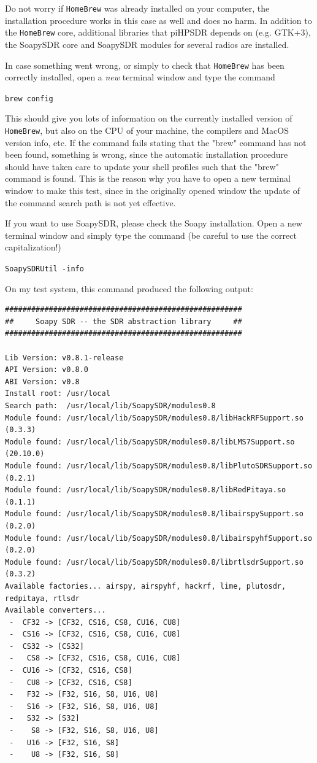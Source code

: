 \documentclass[12pt]{book}
\def\grtt#1{\texttt{\color{magenta}#1}}
\begin{document}
Do not worry if \texttt{HomeBrew} was already installed on your computer, the installation
procedure works in this case as well and does no harm. In addition to
 the \texttt{HomeBrew} core, additional libraries that piHPSDR depends on (e.g. GTK+3), the SoapySDR
 core and SoapySDR modules for several radios are installed. 
 
 In case something went wrong, or simply to check that \texttt{HomeBrew} has been correctly installed,
 open a \textit{new} terminal window and type the command


\grtt{brew config}

 This should give you lots of information on the currently installed version of \texttt{HomeBrew},
 but also on the CPU of your machine, the compilers and MacOS version info, etc. If the command
 fails stating that the "brew" command has not been found, something is wrong, since the automatic
 installation procedure should have taken care to update your shell profiles such that the "brew"
 command is found. This is the reason why you have to open a new terminal window to make this test,
 since in the originally opened window the update of the command search path is not yet effective.

If you want to use SoapySDR, please check the Soapy installation.
Open a new terminal window and simply
type the command (be careful to use the correct capitalization!)

\grtt{SoapySDRUtil -info}

On my test system, this command produced the following output:

\begin{tiny}
\begin{verbatim}
######################################################
##     Soapy SDR -- the SDR abstraction library     ##
######################################################

Lib Version: v0.8.1-release
API Version: v0.8.0
ABI Version: v0.8
Install root: /usr/local
Search path:  /usr/local/lib/SoapySDR/modules0.8
Module found: /usr/local/lib/SoapySDR/modules0.8/libHackRFSupport.so   (0.3.3)
Module found: /usr/local/lib/SoapySDR/modules0.8/libLMS7Support.so     (20.10.0)
Module found: /usr/local/lib/SoapySDR/modules0.8/libPlutoSDRSupport.so (0.2.1)
Module found: /usr/local/lib/SoapySDR/modules0.8/libRedPitaya.so       (0.1.1)
Module found: /usr/local/lib/SoapySDR/modules0.8/libairspySupport.so   (0.2.0)
Module found: /usr/local/lib/SoapySDR/modules0.8/libairspyhfSupport.so (0.2.0)
Module found: /usr/local/lib/SoapySDR/modules0.8/librtlsdrSupport.so   (0.3.2)
Available factories... airspy, airspyhf, hackrf, lime, plutosdr, redpitaya, rtlsdr
Available converters...
 -  CF32 -> [CF32, CS16, CS8, CU16, CU8]
 -  CS16 -> [CF32, CS16, CS8, CU16, CU8]
 -  CS32 -> [CS32]
 -   CS8 -> [CF32, CS16, CS8, CU16, CU8]
 -  CU16 -> [CF32, CS16, CS8]
 -   CU8 -> [CF32, CS16, CS8]
 -   F32 -> [F32, S16, S8, U16, U8]
 -   S16 -> [F32, S16, S8, U16, U8]
 -   S32 -> [S32]
 -    S8 -> [F32, S16, S8, U16, U8]
 -   U16 -> [F32, S16, S8]
 -    U8 -> [F32, S16, S8]
\end{verbatim}
\end{tiny}
\end{document}
